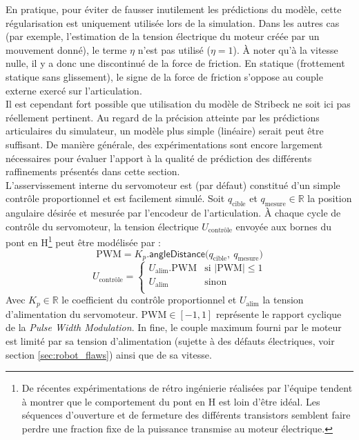 En pratique, pour éviter de fausser inutilement les prédictions du modèle,
cette régularisation est uniquement utilisée lors de la simulation.
Dans les autres cas (par exemple, l'estimation de la tension électrique du moteur
créée par un mouvement donné), le terme $\eta$ n'est pas utilisé ($\eta = 1$).
À noter qu'à la vitesse nulle, il y a donc une discontinué de la force de friction. 
En statique (frottement statique sans glissement), le signe de la
force de friction s'oppose au couple externe exercé sur l'articulation.\\

Il est cependant fort possible que utilisation 
du modèle de Stribeck ne soit ici pas réellement pertinent.
Au regard de la précision atteinte par les prédictions articulaires du simulateur,
un modèle plus simple (linéaire) serait peut être suffisant.
De manière générale, des expérimentations sont encore largement nécessaires 
pour évaluer l'apport à la qualité de prédiction 
des différents \og raffinements \fg présentés dans cette section.\\

L'asservissement interne du servomoteur est (par défaut) constitué d'un
simple contrôle proportionnel et est facilement simulé.
Soit $q_{\text{cible}}$ et $q_{\text{mesure}} \in \mathbb{R}$ la position
angulaire désirée et mesurée par l'encodeur de l'articulation.
À chaque cycle de contrôle du servomoteur, 
la tension électrique $U_{\text{contrôle}}$ envoyée aux bornes 
du pont en H\footnote{De récentes expérimentations
de rétro ingénierie réalisées par l'équipe tendent à montrer que le comportement 
du pont en H est loin d'être idéal. Les séquences d'ouverture et de fermeture 
des différents transistors semblent faire perdre une fraction fixe de la puissance 
transmise au moteur électrique.} peut être modélisée par :
$$
\text{PWM} = K_p.\mathsf{angleDistance}\big(q_{\text{cible}},~ q_{\text{mesure}}\big)
$$
$$
U_{\text{contrôle}} = 
\begin{cases}
    U_{\text{alim}}.\text{PWM} & \text{si }|\text{PWM}| \leqslant 1 \\
    U_{\text{alim}} & \text{sinon}\\
\end{cases}
$$
Avec $K_p \in \mathbb{R}$ le coefficient du contrôle proportionnel et $U_{\text{alim}}$
la tension d'alimentation du servomoteur.
$\text{PWM} \in [-1,1]$ représente le rapport cyclique de la \textit{Pulse Width Modulation}.
In fine, le couple maximum fourni par le moteur est limité par sa tension d'alimentation 
(sujette à des défauts électriques, voir section \ref{sec:robot_flaws}) ainsi que de sa vitesse.\\

